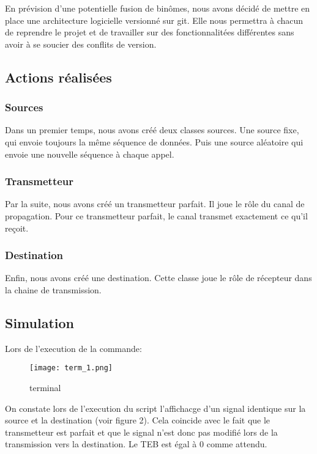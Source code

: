 En prévision d'une potentielle fusion de binômes, nous avons décidé de mettre en place une architecture logicielle versionné sur git.
Elle nous permettra à chacun de reprendre le projet et de travailler sur des fonctionnalitées différentes sans avoir à se soucier des conflits de version.

\subsection{Actions réalisées}

\subsubsection{Sources}

Dans un premier temps, nous avons créé deux classes sources. Une source fixe, qui envoie toujours la même séquence de données. Puis une source aléatoire qui envoie une nouvelle séquence à chaque appel.

\subsubsection{Transmetteur}

Par la suite, nous avons créé un transmetteur parfait. Il joue le rôle du canal de propagation. Pour ce transmetteur parfait, le canal transmet exactement ce qu'il reçoit.

\subsubsection{Destination}

Enfin, nous avons créé une destination. Cette classe joue le rôle de récepteur dans la chaine de transmission.

\subsection{Simulation}

Lors de l'execution de la commande: 

\begin{figure}[H]
    \centering
    \texttt{[image: term\_1.png]}
    \caption{terminal}
\end{figure}

On constate lors de l'execution du script l'affichacge d'un signal identique sur la source et la destination (voir figure 2). Cela coincide 
avec le fait que le transmetteur est parfait et que le signal n'est donc pas modifié lors de la transmission vers la destination.
Le TEB est égal à 0 comme attendu.

